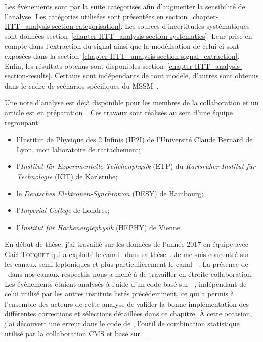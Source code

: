 Les événements sont par la suite catégorisés afin d'augmenter la sensibilité de l'analyse.
Les catégories utilisées sont présentées en section~\ref{chapter-HTT_analysis-section-categorisation}.
Les sources d'incertitudes systématiques sont données section~\ref{chapter-HTT_analysis-section-systematics}.
Leur prise en compte dans l'extraction du signal ainsi que la modélisation de celui-ci sont exposées dans la section~\ref{chapter-HTT_analysis-section-signal_extraction}.
Enfin, les résultats obtenus sont disponibles section~\ref{chapter-HTT_analysis-section-results}.
Certains sont indépendants de tout modèle, d'autres sont obtenus dans le cadre de scénarios spécifiques du MSSM~\cite{Bagnaschi_2019}.
\par
Une note d'analyse \cite{CMS-NOTE-2020-218} est déjà disponible pour les membres de la collaboration et un article est en préparation~\cite{HIG-21-001}.
Ces travaux sont réalisés au sein d'une équipe regroupant:
\begin{itemize}
\item l'Institut de Physique des 2 Infinis (IP2I) de l'Université Claude Bernard de Lyon, mon laboratoire de rattachement;
\item l'\emph{Institut für Experimentelle Teilchenphysik} (ETP) du \emph{Karlsruher Institut für Technologie} (KIT) de Karlsruhe;
\item le \emph{Deutsches Elektronen-Synchrotron} (DESY) de Hambourg;
\item l'\emph{Imperial College} de Londres;
\item l'\emph{Institut für Hochenergiephysik} (HEPHY)
 de Vienne.
\end{itemize}
\par
En début de thèse, j'ai travaillé sur les données de l'année 2017 en équipe avec Gaël \textsc{Touquet} qui a exploité le canal \tauh\tauh\ dans sa thèse~\cite{Gael_thesis}.
Je me suis concentré sur les  canaux semi-leptoniques et plus particulièrement le canal \mu\tauh\ \cite{jrjc2019_torterotot}.
La présence de \tauh\ dans nos canaux respectifs nous a mené à de travailler en étroite collaboration.
Les événements étaient analysés à l'aide d'un code basé sur \HEPPY~\cite{heppy},
indépendant de celui utilisé par les autres instituts listés précédemment,
ce qui a permis à l'ensemble des acteurs de cette analyse de valider la bonne implémentation des différentes corrections et sélections détaillées dans ce chapitre.
À cette occasion, j'ai découvert une erreur dans le code de \COMBINE, l'outil de combination statistique utilisé par la collaboration CMS et basé sur \ROOSTATS~\cite{RooStats}.
